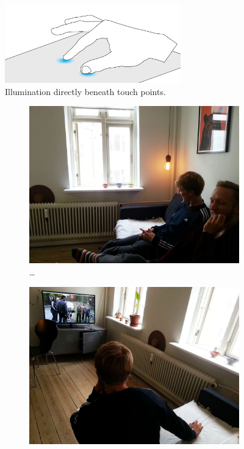 \begin{figure}[h]
  \centering
      \includegraphics[width=3in]{figures/touch/evaluation/backlid_textile}
  \caption[Illumination directly beneath touch points.]
  {Illumination directly beneath touch points.}
  \label{fig:textiletouch:eval:backlighting}
\end{figure}

\begin{figure}
        \centering
        \begin{subfigure}[b]{0.45\textwidth}
                \centering
                \includegraphics[width=\textwidth]{figures/touch/evaluation/sebastian/in_sofa}
                \caption{\dots}
                \label{fig:textiletouch:eval:sebastian:sofa}
        \end{subfigure}
        \begin{subfigure}[b]{0.45\textwidth}
                \centering
                \includegraphics[width=\textwidth]{figures/touch/evaluation/sebastian/sofa_behind_seb}

\end{subfigure}
\end{figure}
